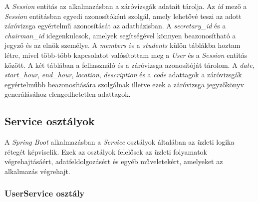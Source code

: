 A \textit{Session} entitás az alkalmazásban a záróvizsgák adatait tárolja. Az \textit{id} mező a \textit{Session} entitásban egyedi azonosítóként szolgál, amely lehetővé teszi az adott záróvizsga egyértelmű azonosítását az adatbázisban. A \textit{secretary\_id} és a \textit{chairman\_id} idegenkulcsok, amelyek segítségével könnyen beazonosítható a jegyző és az elnök személye. A \textit{members} és a \textit{students} külön táblákba hoztam létre, mivel több-több kapcsolatot valósítottam meg a \textit{User} és a \textit{Session} entitás között. A két táblában a felhasználó és a záróvizsga azonosítóját tárolom. A \textit{date}, \textit{start\_hour}, \textit{end\_hour}, \textit{location}, \textit{description} és a \textit{code} adattagok a záróvizsgák egyértelműbb beazonosítására szolgálnak illetve ezek a záróvizsga jegyzőkönyv generálásához elengedhetetlen adattagok.

\newpage
\subsection{Service osztályok}

A \textit{Spring Boot} \cite{spring_boot} alkalmazásban a \textit{Service} osztályok általában az üzleti logika rétegét képviselik. Ezek az osztályok felelősek az üzleti folyamatok végrehajtásáért, adatfeldolgozásért és egyéb műveletekért, amelyeket az alkalmazás végrehajt.

\subsubsection{UserService osztály}

